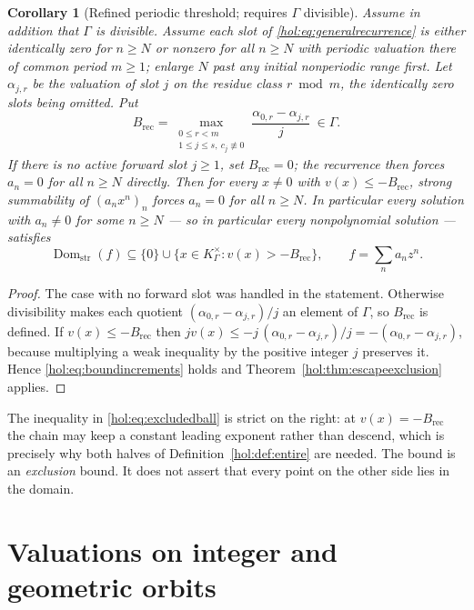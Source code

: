 \documentclass[11pt]{article}
\numberwithin{equation}{section}
\newtheorem{corollary}[theorem]{Corollary}
\theoremstyle{definition}
\theoremstyle{remark}
\newcommand{\K}{K_\Gamma}
\newcommand{\Dom}{\operatorname{Dom}_{\mathrm{str}}}
\begin{document}
\begin{corollary}[Refined periodic threshold; requires $\Gamma$ divisible]
\label{hol:cor:periodic}
Assume in addition that $\Gamma$ is divisible. Assume each slot of
\eqref{hol:eq:generalrecurrence} is either identically zero for $n\ge N$ or
nonzero for all $n\ge N$ with periodic valuation there of common period
$m\ge1$; enlarge $N$ past any initial nonperiodic range first.
Let $\alpha_{j,r}$ be the valuation of slot $j$ on the residue class
$r\bmod m$, the identically zero slots being omitted. Put
\begin{equation}\label{hol:eq:radiusbound}
 B_{\mathrm{rec}}
 =\max_{\substack{0\le r<m\\ 1\le j\le s,\ c_j\not\equiv0}}
   \frac{\alpha_{0,r}-\alpha_{j,r}}{j}\ \in\Gamma.
\end{equation}
If there is no active forward slot $j\ge1$, set $B_{\mathrm{rec}}=0$;
the recurrence then forces $a_n=0$ for all $n\ge N$ directly.
Then for every $x\ne0$ with $v(x)\le-B_{\mathrm{rec}}$, strong summability of
$(a_nx^n)_n$ forces $a_n=0$ for all $n\ge N$. In particular every solution
with $a_n\ne0$ for some $n\ge N$ --- so in particular every nonpolynomial
solution --- satisfies
\begin{equation}\label{hol:eq:excludedball}
 \Dom(f)\subseteq\{0\}\cup\{x\in\K^\times:v(x)>-B_{\mathrm{rec}}\},
 \qquad f=\sum_na_nz^n.
\end{equation}
\end{corollary}

\begin{proof}
The case with no forward slot was handled in the statement. Otherwise
divisibility makes each quotient $(\alpha_{0,r}-\alpha_{j,r})/j$ an element of
$\Gamma$, so $B_{\mathrm{rec}}$ is defined. If $v(x)\le-B_{\mathrm{rec}}$ then
$jv(x)\le-j\,(\alpha_{0,r}-\alpha_{j,r})/j=-(\alpha_{0,r}-\alpha_{j,r})$,
because multiplying a weak inequality by the positive integer $j$ preserves
it. Hence \eqref{hol:eq:boundincrements} holds and
Theorem~\ref{hol:thm:escapeexclusion} applies.
\end{proof}

The inequality in \eqref{hol:eq:excludedball} is strict on the right: at
$v(x)=-B_{\mathrm{rec}}$ the chain may keep a constant leading exponent rather
than descend, which is precisely why both halves of
Definition~\ref{hol:def:entire} are needed. The bound is an \emph{exclusion}
bound. It does not assert that every point on the other side lies in the
domain.

\section{Valuations on integer and geometric orbits}\label{hol:sec:orbits}
\end{document}
